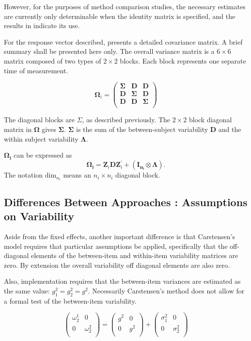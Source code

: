 \documentclass[12pt, a4paper]{report}
\theoremstyle{plain}
\theoremstyle{definition}
\theoremstyle{remark}
\begin{document}
However, for the purposes of method comparison studies, the necessary estimates are currently only determinable when the identity matrix is specified, and the results in \citet{roy} indicate its use.

For the response vector described, \citet{hamlett} presents a detailed covariance matrix. A brief summary shall be presented here only. The overall variance matrix is a $6 \times 6$ matrix composed of two types of $2 \times 2$ blocks. Each block represents one separate time of measurement.

\[
\boldsymbol{\Omega}_{i} = \left(
\begin{array}{ccc}
\boldsymbol{\Sigma} & \boldsymbol{D} & \boldsymbol{D}\\
\boldsymbol{D} & \boldsymbol{\Sigma} & \boldsymbol{D}\\
\boldsymbol{D} & \boldsymbol{D} & \boldsymbol{\Sigma}\\
\end{array}\right)
\]

The diagonal blocks are $\Sigma$, as described previously. The $2 \times 2$ block diagonal matrix in $\boldsymbol{\Omega}$ gives $\boldsymbol{\Sigma}$. $\boldsymbol{\Sigma}$ is the sum of the between-subject variability $\boldsymbol{D}$ and the within subject variability $\boldsymbol{\Lambda}$.

$\boldsymbol{\Omega_{i}}$ can be expressed as
\[
\boldsymbol{\Omega_{i}} = \boldsymbol{Z}_{i}\boldsymbol{D}\boldsymbol{Z}_{i}^\prime + ({\boldsymbol{I_{n_{i}}} \otimes \boldsymbol{\Lambda}}).
\]
The notation $\mbox{dim}_{n_{i}}$ means an $n_{i} \times n_{i}$ diagonal block.


\subsection{Differences Between Approaches : Assumptions on Variability}
Aside from the fixed effects, another important difference is that Carstensen's model requires that particular assumptions be applied, specifically that the off-diagonal elements of the between-item
and within-item variability matrices are zero. By extension the
overall variability off diagonal elements are also zero.

Also, implementation requires that the between-item variances are
estimated as the same value: $g^2_1 = g^2_2 = g^2$. Necessarily
Carstensen's method does not allow for a formal test of the
between-item variability.

\[\left(\begin{array}{cc}
\omega^1_2  & 0 \\
0 & \omega^2_2 \\
\end{array}  \right)
=  \left(
\begin{array}{cc}
g^2  & 0 \\
0 & g^2 \\
\end{array} \right)+
\left(
\begin{array}{cc}
\sigma^2_1  & 0 \\
0 & \sigma^2_2 \\
\end{array}\right)
\]
\end{document}
